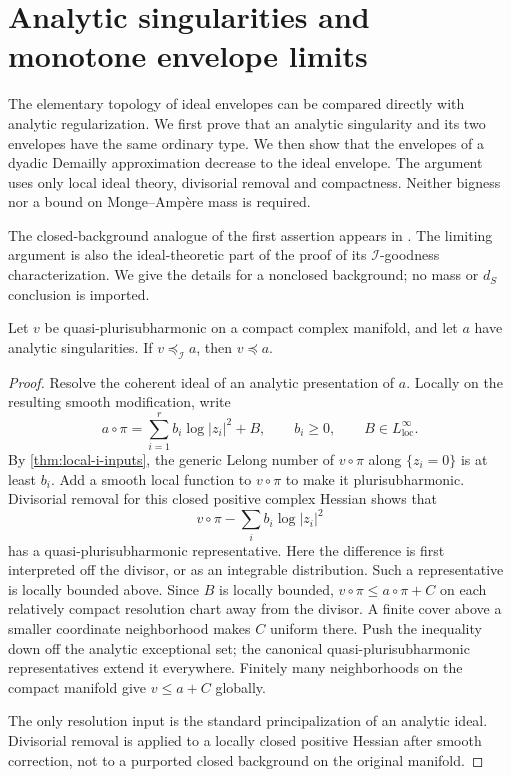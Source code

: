 \section{Analytic singularities and monotone envelope limits}
\label{sec:analytic-envelope-limits}

The elementary topology of ideal envelopes can be compared directly with analytic regularization. We first prove that an analytic singularity and its two envelopes have the same ordinary type. We then show that the envelopes of a dyadic Demailly approximation decrease to the ideal envelope. The argument uses only local ideal theory, divisorial removal and compactness. Neither bigness nor a bound on Monge--Amp\`ere mass is required.

The closed-background analogue of the first assertion appears in \cite[proposition on analytic singularities in the envelope chapter]{SGPT}. The limiting argument is also the ideal-theoretic part of the proof of its $\mathcal I$-goodness characterization. We give the details for a nonclosed background; no mass or $d_S$ conclusion is imported.

\begin{lemma}\label{lem:analytic-ideal-dominance}
Let $v$ be quasi-plurisubharmonic on a compact complex manifold, and let $a$ have analytic singularities. If $v\preceq_{\mathcal I}a$, then $v\preceq a$.
\end{lemma}
\begin{proof}
Resolve the coherent ideal of an analytic presentation of $a$. Locally on the resulting smooth modification, write
\[
 a\circ\pi=\sum_{i=1}^r b_i\log|z_i|^2+B,
 \qquad b_i\geq0,\qquad B\in L^\infty_{\mathrm{loc}}.
\]
By \cref{thm:local-i-inputs}, the generic Lelong number of $v\circ\pi$ along $\{z_i=0\}$ is at least $b_i$. Add a smooth local function to $v\circ\pi$ to make it plurisubharmonic. Divisorial removal for this closed positive complex Hessian shows that
\[
 v\circ\pi-\sum_i b_i\log|z_i|^2
\]
has a quasi-plurisubharmonic representative. Here the difference is first interpreted off the divisor, or as an integrable distribution. Such a representative is locally bounded above. Since $B$ is locally bounded, $v\circ\pi\leq a\circ\pi+C$ on each relatively compact resolution chart away from the divisor. A finite cover above a smaller coordinate neighborhood makes $C$ uniform there. Push the inequality down off the analytic exceptional set; the canonical quasi-plurisubharmonic representatives extend it everywhere. Finitely many neighborhoods on the compact manifold give $v\leq a+C$ globally.

The only resolution input is the standard principalization of an analytic ideal. Divisorial removal is applied to a locally closed positive Hessian after smooth correction, not to a purported closed background on the original manifold.
\end{proof}

